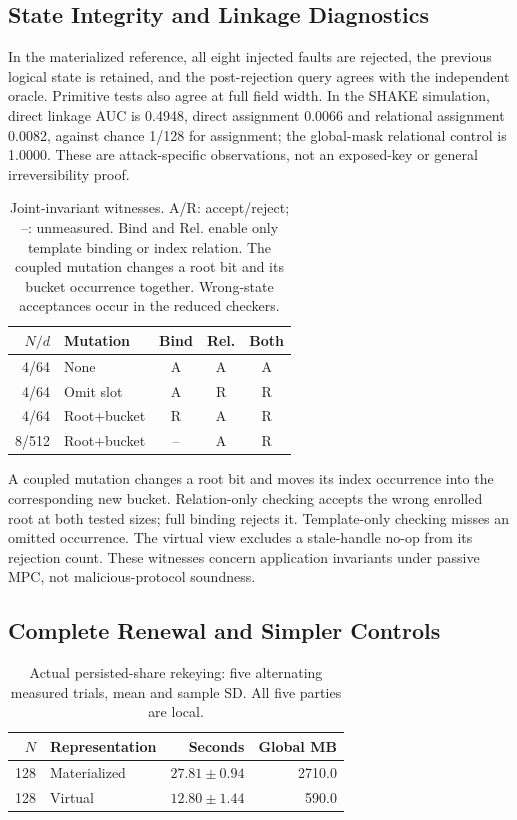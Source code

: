 \subsection{State Integrity and Linkage Diagnostics}\label{sec:integrity_results}

In the materialized reference, all eight injected faults are rejected, the previous logical state is retained, and the post-rejection query agrees with the independent oracle. Primitive tests also agree at full field width. In the SHAKE simulation, direct linkage AUC is 0.4948, direct assignment 0.0066 and relational assignment 0.0082, against chance 1/128 for assignment; the global-mask relational control is 1.0000. These are attack-specific observations, not an exposed-key or general irreversibility proof.

\begin{table}[t]
\caption{Joint-invariant witnesses. A/R: accept/reject; --: unmeasured. Bind and Rel. enable only template binding or index relation. The coupled mutation changes a root bit and its bucket occurrence together. Wrong-state acceptances occur in the reduced checkers.}
\label{tab:joint_ablation}\centering\small
\setlength{\tabcolsep}{3pt}
\begin{tabular}{r l c c c}
\toprule $N/d$ & Mutation & Bind & Rel. & Both \\
\midrule
4/64 & None & A & A & A \\
4/64 & Omit slot & A & R & R \\
4/64 & Root+bucket & R & A & R \\
8/512 & Root+bucket & -- & A & R \\
\bottomrule\end{tabular}\end{table}

A coupled mutation changes a root bit and moves its index occurrence into the corresponding new bucket. Relation-only checking accepts the wrong enrolled root at both tested sizes; full binding rejects it. Template-only checking misses an omitted occurrence. The virtual view excludes a stale-handle no-op from its rejection count. These witnesses concern application invariants under passive MPC, not malicious-protocol soundness.

\subsection{Complete Renewal and Simpler Controls}\label{sec:cost_results}

\begin{table}[t]
\caption{Actual persisted-share rekeying: five alternating measured trials, mean and sample SD. All five parties are local.}
\label{tab:v3persisted}\centering\small
\setlength{\tabcolsep}{3pt}
\begin{tabular}{rlrr}
\toprule
$N$ & Representation & Seconds & Global MB \\
\midrule
128 & Materialized & $27.81\pm0.94$ & 2710.0 \\
128 & Virtual & $12.80\pm1.44$ & 590.0 \\
\bottomrule
\end{tabular}
\end{table}

